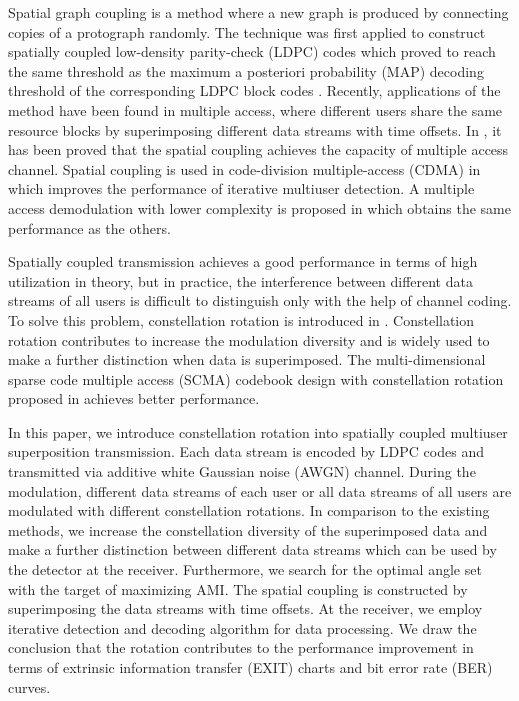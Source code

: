 \documentclass[conference]{IEEEtran}
\begin{document}
Spatial graph coupling is a method where a new graph is produced by connecting copies of a protograph randomly. The technique was first applied to construct spatially coupled low-density parity-check (LDPC) codes \cite{4} which proved to reach the same threshold as the maximum a posteriori probability (MAP) decoding threshold of the corresponding LDPC block codes \cite{5}. Recently, applications of the method have been found in multiple access, where different users share the same resource blocks by superimposing different data streams with time offsets. In \cite{6}, it has been proved that the spatial coupling achieves the capacity of multiple access channel. Spatial coupling is used in code-division multiple-access (CDMA) in \cite{7} which improves the performance of iterative multiuser detection. A multiple access demodulation with lower complexity is proposed in \cite{8} which obtains the same performance as the others.

Spatially coupled transmission achieves a good performance in terms of high utilization in theory, but in practice, the interference between different data streams of all users is difficult to distinguish only with the help of channel coding. To solve this problem, constellation rotation is introduced in \cite{9}. Constellation rotation contributes to increase the modulation diversity and is widely used to make a further distinction when data is superimposed. The multi-dimensional sparse code multiple access (SCMA) codebook design with constellation rotation proposed in \cite{10} achieves better performance.

In this paper, we introduce constellation rotation into spatially coupled multiuser superposition transmission. Each data stream is encoded by LDPC codes and transmitted via additive white Gaussian noise (AWGN) channel. During the modulation, different data streams of each user or all data streams of all users are modulated with different constellation rotations. In comparison to the existing methods, we increase the constellation diversity of the superimposed data and make a further distinction between different data streams which can be used by the detector at the receiver. Furthermore, we search for the optimal angle set with the target of maximizing AMI. The spatial coupling is constructed by superimposing the data streams with time offsets. At the receiver, we employ iterative detection and decoding algorithm for data processing. We draw the conclusion that the rotation contributes to the performance improvement in terms of extrinsic information transfer (EXIT) charts and bit error rate (BER) curves.
\end{document}
